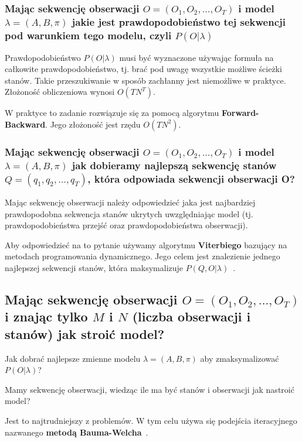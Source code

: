 \documentclass[wi]{zut}
\begin{document}
\subsubsection{Mając sekwencję obserwacji $O = (O_1, O_2, \ldots, O_T)$ i model $\lambda = (A, B, \pi)$ jakie jest prawdopodobieństwo tej sekwencji pod warunkiem tego modelu, czyli $P(O|\lambda)$}

Prawdopodobieństwo $P(O|\lambda)$ musi być wyznaczone używając formuła na całkowite prawdopodobieństwo, tj. brać pod uwagę wszystkie możliwe ścieżki stanów. Takie przeszukiwanie w sposób zachłanny jest niemożliwe w praktyce. Złożoność obliczeniowa wynosi $O(TN^T)$\cite{Pietrzykowski2020}. 

W praktyce to zadanie rozwiązuje się za pomocą algorytmu \textbf{Forward-Backward}. Jego złożoność jest rzędu $O(TN^2)$\cite{Pietrzykowski2020}.

\subsubsection{Mając sekwencję obserwacji $O = (O_1, O_2, \ldots, O_T)$ i model $\lambda = (A, B, \pi)$ jak dobieramy najlepszą sekwencję stanów $Q = (q_1, q_2, \ldots, q_T)$, która odpowiada sekwencji obserwacji O?}

Mając sekwencję obserwacji należy odpowiedzieć jaka jest najbardziej prawdopodobna sekwencja stanów ukrytych uwzględniając model (tj. prawdopodobieństwa przejść oraz prawdopodobieństwa obserwacji).

Aby odpowiedzieć na to pytanie używamy algorytmu \textbf{Viterbiego} bazujący na metodach programowania dynamicznego. Jego celem jest znalezienie jednego najlepszej sekwencji stanów, która maksymalizuje $P(Q, O|\lambda)$~\cite{Pietrzykowski2020}.

\subsection{Mając sekwencję obserwacji $O = (O_1, O_2, \ldots, O_T)$ i znając tylko $M$ i $N$ (liczba obserwacji i stanów) jak stroić model?}

Jak dobrać najlepsze zmienne modelu $\lambda = (A, B, \pi)$ aby zmaksymalizować $P(O|\lambda)$?

Mamy sekwencję obserwacji, wiedząc ile ma być stanów i obserwacji jak nastroić model?

Jest to najtrudniejszy z problemów. W tym celu używa się podejścia iteracyjnego nazwanego \textbf{metodą Bauma-Welcha}~\cite{Pietrzykowski2020}.
\end{document}
